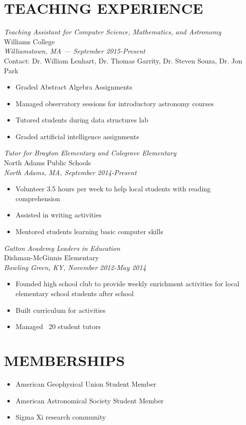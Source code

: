 \documentclass[line,margin]{res}
\begin{document}
\begin{resume}
  \section{TEACHING EXPERIENCE}
  {\sl Teaching Assistant for Computer Science, Mathematics, and Astronomy} \\
  Williams College \\
  {\it Williamstown, MA — September 2015-Present} \\ 
  Contact: Dr. William Lenhart, Dr. Thomas Garrity, Dr. Steven Souza, Dr. Jon Park \\
  \begin{itemize}
  \item Graded Abstract Algebra Assignments
  \item Managed observatory sessions for introductory astronomy courses
  \item Tutored students during data structures lab
  \item Graded artificial intelligence assignments
  \end{itemize}

  {\sl Tutor for Brayton Elementary and Colegrove Elementary} \\
  North Adams Public Schools \\
  {\it North Adams, MA, September 2014-Present} \\
  \begin{itemize}
  \item Volunteer 3.5 hours per week to help local students with reading comprehension
  \item Assisted in writing activities
  \item Mentored students learning basic computer skills
  \end{itemize}

  {\sl Gatton Academy Leaders in Education} \\
  Dishman-McGinnis Elementary \\
  {\it Bowling Green, KY, November 2012-May 2014}
  \begin{itemize}
  \item Founded high school club to provide weekly enrichment activities for local elementary school students after school
  \item Built curriculum for activities
  \item Managed ~20 student tutors
  \end{itemize}
  
  \section{MEMBERSHIPS}
  \begin{itemize}[leftmargin=*]
  \item  American Geophysical Union Student Member
  \item American Astronomical Society Student Member
  \item Sigma Xi research community
  \end{itemize}
  

\end{resume}
\end{document}
